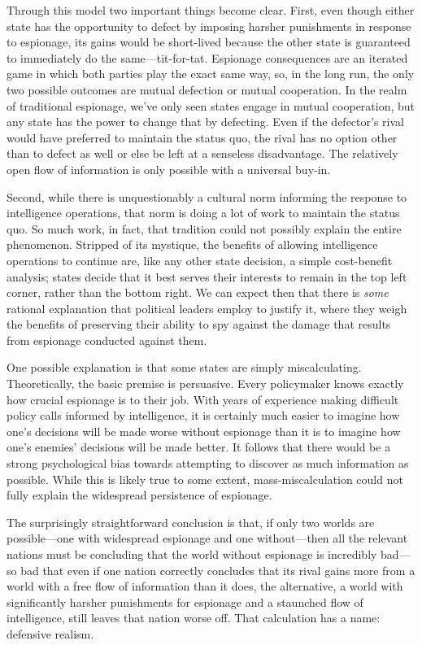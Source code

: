 \documentclass[14pt]{extarticle}
\begin{document}
Through this model two important things become clear. First, even though either state has the opportunity to defect by imposing harsher punishments in response to espionage, its gains would be short-lived because the other state is guaranteed to immediately do the same---tit-for-tat. Espionage consequences are an iterated game in which both parties play the exact same way, so, in the long run, the only two possible outcomes are mutual defection or mutual cooperation. In the realm of traditional espionage, we've only seen states engage in mutual cooperation, but any state has the power to change that by defecting. Even if the defector's rival would have preferred to maintain the status quo, the rival has no option other than to defect as well or else be left at a senseless disadvantage. The relatively open flow of information is only possible with a universal buy-in.

Second, while there is unquestionably a cultural norm informing the response to intelligence operations, that norm is doing a lot of work to maintain the status quo. So much work, in fact, that tradition could not possibly explain the entire phenomenon. Stripped of its mystique, the benefits of allowing intelligence operations to continue are, like any other state decision, a simple cost-benefit analysis; states decide that it best serves their interests to remain in the top left corner, rather than the bottom right. We can expect then that there is \emph{some} rational explanation that political leaders employ to justify it, where they weigh the benefits of preserving their ability to spy against the damage that results from espionage conducted against them.

One possible explanation is that some states are simply miscalculating. Theoretically, the basic premise is persuasive. Every policymaker knows exactly how crucial espionage is to their job. With years of experience making difficult policy calls informed by intelligence, it is certainly much easier to imagine how one's decisions will be made worse without espionage than it is to imagine how one's enemies' decisions will be made better. It follows that there would be a strong psychological bias towards attempting to discover as much information as possible. While this is likely true to some extent, mass-miscalculation could not fully explain the widespread persistence of espionage.

The surprisingly straightforward conclusion is that, if only two worlds are possible---one with widespread espionage and one without---then all the relevant nations must be concluding that the world without espionage is incredibly bad---so bad that even if one nation correctly concludes that its rival gains more from a world with a free flow of information than it does, the alternative, a world with significantly harsher punishments for espionage and a staunched flow of intelligence, still leaves that nation worse off. That calculation has a name: defensive realism.
\end{document}
